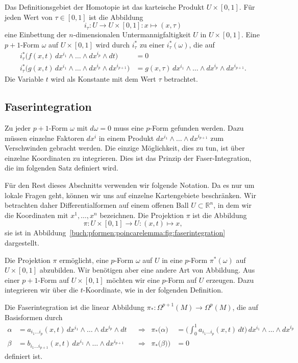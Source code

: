 Das Definitionsgebiet der Homotopie ist das karteische Produkt
$U\times[0,1]$.
Für jeden Wert von $\tau\in[0,1]$ ist die Abbildung
\[
i_\tau
\colon U \to U\times[0,1]
:
x\mapsto (x,\tau)
\]
eine Einbettung der $n$-dimensionalen Untermannigfaltigkeit $U$ in
$U\times[0,1]$.
Eine $p+1$-Form $\omega$ auf $U\times[0,1]$ wird durch $i_\tau^*$ zu
einer $i_\tau^*(\omega)$, die auf
\begin{align*}
i_\tau^*\bigl(
f(x,t)
\,dx^{i_1}\wedge \dots \wedge dx^{i_p}\wedge dt
\bigr)
&=
0
\\
i_\tau^*\bigl(
g(x,t)
\,dx^{i_1}\wedge \dots \wedge dx^{i_p}\wedge dx^{i_{p+1}}
\bigr)
&=
g(x,\tau)
\,dx^{i_1}\wedge \dots \wedge dx^{i_p}\wedge dx^{i_{p+1}}.
\end{align*}
Die Variable $t$ wird als Konstante mit dem Wert $\tau$ betrachtet.

%
%
\subsection{Faserintegration
\label{buch:pformen:poincare:subsection:faserintegration}}
%
Zu jeder $p+1$-Form $\omega$ mit $d\omega=0$ muss eine $p$-Form gefunden
werden.
Dazu müssen einzelne Faktoren $dx^i$ in einem Produkt
$dx^{i_1}\wedge\dots\wedge dx^{i_{p+1}}$ zum Verschwinden gebracht
werden.
Die einzige Möglichkeit, dies zu tun, ist über einzelne Koordinaten zu
integrieren.
Dies ist das Prinzip der Faser-Integration, die im folgenden Satz
definiert wird.

Für den Rest dieses Abschnitts verwenden wir folgende Notation.
Da es nur um lokale Fragen geht, können wir uns auf einzelne
Kartengebiete beschränken.
Wir betrachten daher Differentialformen auf einem offenen Ball
$U\subset\mathbb{R}^n$, in dem wir die Koordinaten mit $x^1,\dots,x^n$
bezeichnen.
Die Projektion $\pi$ ist die Abbildung
\[
\pi
\colon U \times [0,1]\to U : (x,t) \mapsto x,
\]
sie ist in Abbildung~\ref{buch:pformen:poincarelemma:fig:faserintegration}
dargestellt.

Die Projektion $\pi$ ermöglicht, eine $p$-Form $\omega$ auf $U$ in eine
$p$-Form $\pi^*(\omega)$ auf $U\times [0,1]$ abzubilden.
Wir benötigen aber eine andere Art von Abbildung.
Aus einer $p+1$-Form auf $U\times[0,1]$ möchten wir eine $p$-Form auf
$U$ erzeugen.
Dazu integrieren wir über die $t$-Koordinate, wie in der folgenden
Definition.

\begin{definition}
Die Faserintegration ist die linear Abbildung
$\pi_*\colon \Omega^{p+1}(M)\to\Omega^p(M)$, die auf Basisformen durch
\begin{align*}
\alpha
&=
a_{i_1 \dots i_p}(x,t)
\,
dx^{i_1}\wedge\dots\wedge dx^{i_p}\wedge dt
&&\Rightarrow&
\pi_*\bigl(
\alpha
\bigr)
&=
\biggl(
\int_0^1 a_{i_1 \dots i_p}(x,t)\,dt
\biggr)
\,
dx^{i_1}\wedge\dots\wedge dx^{i_p}
\\
\beta
&=
b_{i_1 \dots i_{p+1}}(x,t)
\,
dx^{i_1}\wedge \dots \wedge dx^{i_{p+1}}
&&\Rightarrow&
\pi_*\bigl(\beta)
\bigr)
&=
0
\end{align*}
definiert ist.
\end{definition}

